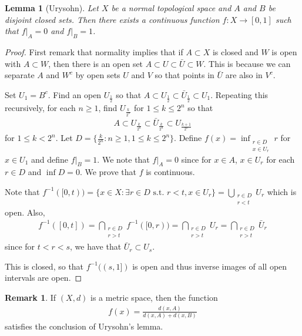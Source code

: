 \documentclass[11pt]{amsart}
\newtheorem{lemma}[theorem]{Lemma}
\theoremstyle{definition}
\newtheorem{remark}[theorem]{Remark}
\numberwithin{equation}{section}
\begin{document}
\begin{lemma}[Urysohn]
    Let $X$ be a normal topological space and $A$ and $B$ be disjoint closed sets. Then there exists a continuous function $f:X\to[0,1]$ such that $f|_A=0$ and $f|_B=1$.
\end{lemma}
\begin{proof}
    First remark that normality implies that if $A\subset X$ is closed and $W$ is open with $A\subset W$, then there is an open set $A\subset U\subset\bar U\subset W$. This is because we can separate $A$ and $W^c$ by open sets $U$ and $V$ so that points in $\bar U$ are also in $V^c$.

    Set $U_1=B^c$. Find an open $U_{\frac{1}{2}}$ so that $A\subset U_\frac{1}{2}\subset\bar U_\frac{1}{2}\subset U_1$. Repeating this recursively, for each $n\ge 1$, find $U_\frac{k}{2^n}$ for $1\le k\le 2^n$ so that
    \begin{align*}
        A\subset U_{\frac{k}{2^n}}\subset\bar U_{\frac{k}{2^n}}\subset U_{\frac{k+1}{2^n}}
    \end{align*}
    for $1\le k<2^n$. Let $D=\{\frac{k}{2^n}:n\ge 1,1\le k\le 2^n\}$. Define $f(x)=\inf_{\substack{r\in D\\x\in U_r}}r$ for $x\in U_1$ and define $f|_B=1$. We note that $f|_A=0$ since for $x\in A$, $x\in U_r$ for each $r\in D$ and $\inf D=0$. We prove that $f$ is continuous.

    Note that $f^{-1}([0,t))=\{x\in X:\exists r\in D\text{ s.t. }r<t,x\in U_r\}=\bigcup_{\substack{r\in D\\r< t}}U_r$ which is open. Also, 
    \begin{align*}
        f^{-1}([0,t])=\bigcap_{\substack{r\in D\\r>t}}f^{-1}([0,r))=\bigcap_{\substack{r\in D\\r>t}}U_r=\bigcap_{\substack{r\in D\\r>t}}\bar U_r
    \end{align*}
    since for $t<r<s$, we have that $\bar U_r\subset U_s$.

    This is closed, so that $f^{-1}((s,1])$ is open and thus inverse images of all open intervals are open.
\end{proof}
\begin{remark}
    If $(X,d)$ is a metric space, then the function
    \begin{align*}
        f(x)=\frac{d(x,A)}{d(x,A)+d(x,B)}
    \end{align*}
    satisfies the conclusion of Urysohn's lemma.
\end{remark}
\end{document}
